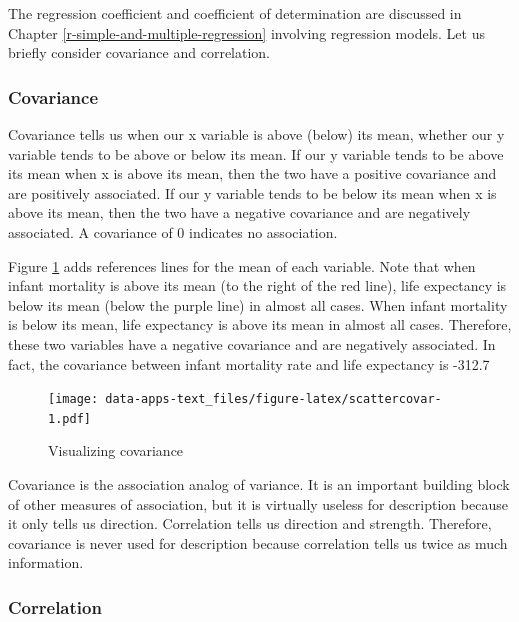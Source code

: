 \documentclass[
]{book}
\begin{document}
The regression coefficient and coefficient of determination are discussed in Chapter \ref{r-simple-and-multiple-regression} involving regression models. Let us briefly consider covariance and correlation.

\hypertarget{covariance}{%
\subsubsection*{Covariance}\label{covariance}}

Covariance tells us when our x variable is above (below) its mean, whether our y variable tends to be above or below its mean. If our y variable tends to be above its mean when x is above its mean, then the two have a positive covariance and are positively associated. If our y variable tends to be below its mean when x is above its mean, then the two have a negative covariance and are negatively associated. A covariance of 0 indicates no association.

Figure \ref{fig:scattercovar} adds references lines for the mean of each variable. Note that when infant mortality is above its mean (to the right of the red line), life expectancy is below its mean (below the purple line) in almost all cases. When infant mortality is below its mean, life expectancy is above its mean in almost all cases. Therefore, these two variables have a negative covariance and are negatively associated. In fact, the covariance between infant mortality rate and life expectancy is -312.7

\begin{figure}
\centering
\texttt{[image: data-apps-text\_files/figure-latex/scattercovar-1.pdf]}
\caption{\label{fig:scattercovar}Visualizing covariance}
\end{figure}

Covariance is the association analog of variance. It is an important building block of other measures of association, but it is virtually useless for description because it only tells us direction. Correlation tells us direction and strength. Therefore, covariance is never used for description because correlation tells us twice as much information.

\hypertarget{correlation}{%
\subsubsection*{Correlation}\label{correlation}}
\end{document}
